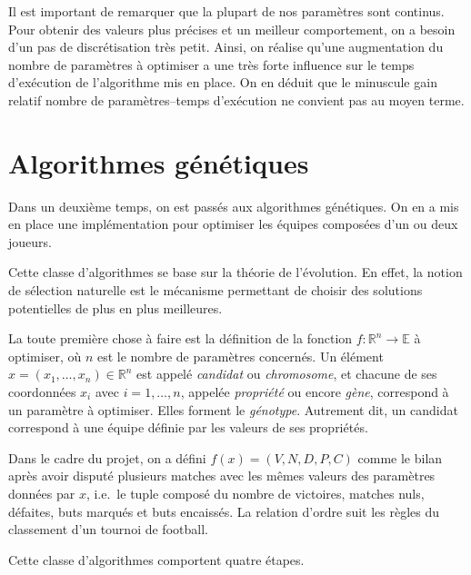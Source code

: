 \documentclass[12pt,a4paper]{article}
\begin{document}
Il est important de remarquer que la plupart de nos param\`etres sont continus. 
Pour obtenir des valeurs plus pr\'ecises et un meilleur comportement, on a 
besoin d'un pas de discr\'etisation tr\`es petit. Ainsi, on r\'ealise qu'une 
augmentation du nombre de param\`etres \`a optimiser a une tr\`es forte 
influence sur le temps d'ex\'ecution de l'algorithme mis en place. On en 
d\'eduit que le minuscule gain relatif nombre de param\`etres--temps 
d'ex\'ecution ne convient pas au moyen terme.

\section{Algorithmes g\'en\'etiques}
Dans un deuxi\`eme temps, on est pass\'es aux algorithmes g\'en\'etiques. On en 
a mis en place une impl\'ementation pour optimiser les \'equipes compos\'ees 
d'un ou deux joueurs.

Cette classe d'algorithmes se base sur la th\'eorie de l'\'evolution. En effet, 
la notion de s\'election naturelle est le m\'ecanisme permettant de choisir des 
solutions potentielles de plus en plus meilleures.

La toute premi\`ere chose \`a faire est la d\'efinition de la fonction 
$f: \mathbb{R}^n \to \mathbb{E}$ \`a optimiser, o\`u $n$ est le nombre de 
param\`etres concern\'es. Un \'el\'ement $x=(x_1,\dotsc,x_n) \in \mathbb{R}^n$ 
est appel\'e {\itshape candidat} ou {\itshape chromosome}, et chacune de ses 
coordonn\'ees $x_i$ avec $i=1,\dotsc,n$, appel\'ee {\itshape propri\'et\'e} 
ou encore {\itshape g\`ene}, correspond \`a un param\`etre \`a optimiser. Elles 
forment le {\itshape g\'enotype}.
Autrement dit, un candidat correspond \`a une \'equipe d\'efinie par les valeurs
de ses propri\'et\'es.

Dans le cadre du projet, on a d\'efini $f(x)=(V,N,D,P,C)$ comme le 
bilan apr\`es avoir disput\'e plusieurs matches avec les m\^emes valeurs des 
param\`etres donn\'ees par $x$, i.e.\ le tuple compos\'e du 
nombre de 
victoires, matches nuls, d\'efaites, buts marqu\'es et buts encaiss\'es. La 
relation d'ordre suit les r\`egles du classement d'un tournoi de football.

Cette classe d'algorithmes comportent quatre \'etapes.
\end{document}

